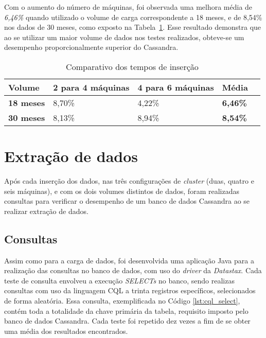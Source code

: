 Com o aumento do número de máquinas, foi observada uma melhora média de \emph{6,46\%} quando utilizado o volume de carga correspondente a 18 meses, e de {8,54\%} nos dados de 30 meses, como exposto na Tabela~\ref{tb:comparativo_insert}. Esse resultado demonstra que ao se utilizar um maior volume de dados nos testes realizados, obteve-se um desempenho proporcionalmente superior do Cassandra.

\begin{table}[]
	\centering
	\caption{Comparativo dos tempos de inserção}
	\label{tb:comparativo_insert}
	\begin{tabular}{lllll}
		\textbf{Volume} 	& \textbf{2 para 4 máquinas} & \textbf{4 para 6 máquinas} & \textbf{Média}  &  \\ \hline
		\textbf{18 meses} 	& 8,70\%                     & 4,22\%                     & \textbf{6,46\%} &  \\ \hline
		\textbf{30 meses}	& 8,13\%                     & 8,94\%                     & \textbf{8,54\%} &  \\ \hline
	\end{tabular}
\end{table}


\section{Extração de dados}
Após cada inserção dos dados, nas três configurações de \emph{cluster} (duas, quatro e seis máquinas), e com os dois volumes distintos de dados, foram realizadas consultas para verificar o desempenho de um banco de dados Cassandra ao se realizar extração de dados.

\subsection{Consultas}
Assim como para a carga de dados, foi desenvolvida uma aplicação Java para a realização das consultas no banco de dados, com uso do \emph{driver} da \emph{Datastax}. Cada teste de consulta envolveu a execução \emph{SELECTs} no banco, sendo realizas consultas com uso da linguagem CQL a trinta registros específicos, selecionados de forma aleatória. Essa consulta, exemplificada no Código \ref{lst:cql_select}, contém toda a totalidade da chave primária da tabela, requisito imposto pelo banco de dados Cassandra. Cada teste foi repetido dez vezes a fim de se obter uma média dos resultados encontrados.

